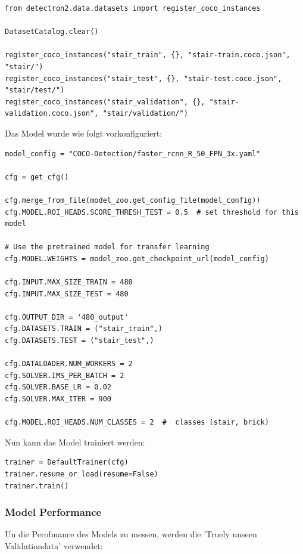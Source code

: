 \begin{verbatim}
from detectron2.data.datasets import register_coco_instances

DatasetCatalog.clear()

register_coco_instances("stair_train", {}, "stair-train.coco.json", "stair/")
register_coco_instances("stair_test", {}, "stair-test.coco.json", "stair/test/")
register_coco_instances("stair_validation", {}, "stair-validation.coco.json", "stair/validation/")
\end{verbatim}

Das Model wurde wie folgt vorkonfiguriert:

\begin{verbatim}
model_config = "COCO-Detection/faster_rcnn_R_50_FPN_3x.yaml"

cfg = get_cfg()

cfg.merge_from_file(model_zoo.get_config_file(model_config))
cfg.MODEL.ROI_HEADS.SCORE_THRESH_TEST = 0.5  # set threshold for this model

# Use the pretrained model for transfer learning
cfg.MODEL.WEIGHTS = model_zoo.get_checkpoint_url(model_config)

cfg.INPUT.MAX_SIZE_TRAIN = 480
cfg.INPUT.MAX_SIZE_TEST = 480

cfg.OUTPUT_DIR = '480_output'
cfg.DATASETS.TRAIN = ("stair_train",)
cfg.DATASETS.TEST = ("stair_test",)

cfg.DATALOADER.NUM_WORKERS = 2
cfg.SOLVER.IMS_PER_BATCH = 2
cfg.SOLVER.BASE_LR = 0.02
cfg.SOLVER.MAX_ITER = 900

cfg.MODEL.ROI_HEADS.NUM_CLASSES = 2  #  classes (stair, brick)
\end{verbatim}

Nun kann das Model trainiert werden:

\begin{verbatim}
trainer = DefaultTrainer(cfg)
trainer.resume_or_load(resume=False)
trainer.train()
\end{verbatim}


\subsubsection{Model Performance}

Un die Perofmance des Models zu messen, werden die 'Truely unseen Validationdata' verwendet:


